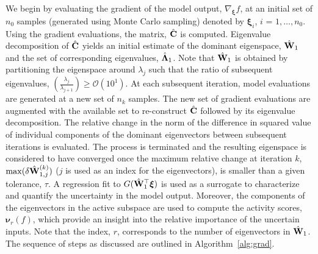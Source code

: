 We begin by evaluating the gradient of the model output, $\nabla_{\bm{\xi}}f$,
at an initial set of $n_0$ samples (generated using Monte Carlo sampling)
denoted by $\bm{\xi}_i$, $i$ = $1,\ldots,n_0$.
Using the gradient
evaluations, the matrix, $\hat{\mathbf{{C}}}$ is computed. Eigenvalue decomposition
of $\hat{\mathbf{{C}}}$ yields an initial estimate of the dominant eigenspace,
$\hat{\mathbf{{W}}}_1$ and the set of corresponding eigenvalues, 
$\hat{\mathbf{{\Lambda}}}_1$. Note that $\hat{\mathbf{{W}}}_1$ is obtained by
partitioning the eigenspace around $\lambda_j$ such that the ratio of
subsequent eigenvalues,
$\left(\frac{\lambda_j}{\lambda_{j+1}}\right)\ge\mathcal{O}(10^1)$.
 At each subsequent iteration, model evaluations are
generated at a new set of $n_k$ samples. The new set of gradient evaluations
are augmented with the available set to re-construct $\hat{\mathbf{{C}}}$ followed
by its eigenvalue decomposition. The relative change in the norm of the
difference in squared value of individual components of the dominant
eigenvectors between subsequent iterations is evaluated. The process is
terminated and the resulting eigenspace is considered to have converged once
the maximum relative change at iteration $k$, $\max(\delta \hat{\mathbf{{W}}}_{1,j}^{(k)})$
($j$ is used as an index for the eigenvectors),
is smaller than a given tolerance, $\tau$.  A regression fit to
$G(\hat{\mathbf{{W}}}_1^\top\bm{\xi})$ is used as a surrogate to characterize and
quantify the uncertainty in the model output. Moreover, the components of the
eigenvectors in the active subspace are used to compute the activity scores, $\bm{\nu}_r(f)$,
which provide an insight into the relative importance of the uncertain inputs.
Note that the index, $r$, corresponds to the number of eigenvectors in
$\hat{\mathbf{{W}}}_1$. The sequence of steps as discussed are outlined
in Algorithm~\ref{alg:grad}.


